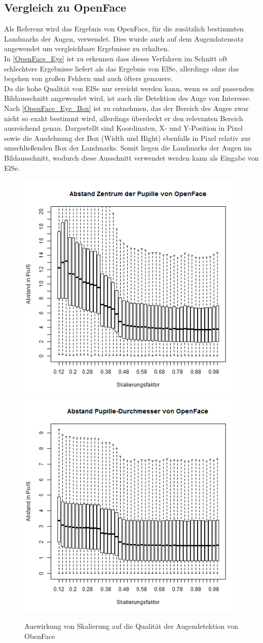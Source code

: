 \subsection{Vergleich zu OpenFace}
Als Referenz wird das Ergebnis von OpenFace, für die zusätzlich bestimmten Landmarks der Augen, verwendet. Dies wurde auch auf dem Augendatensatz \cite{database_Eye} angewendet um vergleichbare Ergebnisse zu erhalten.\\
In \autoref{OpenFace_Eye} ist zu erkennen dass dieses Verfahren im Schnitt oft schlechtere Ergebnisse liefert als das Ergebnis von ElSe, allerdings ohne das begehen von großen Fehlern und auch öfters genauere.\\
Da die hohe Qualität von ElSe nur erreicht werden kann, wenn es auf passenden Bildausschnitt angewendet wird, ist auch die Detektion des Auge von Interesse.\\
Nach \autoref{OpenFace_Eye_Box} ist zu entnehmen, das der Bereich des Auges zwar nicht so exakt bestimmt wird, allerdings überdeckt er den relevanten Bereich ausreichend genau. Dargestellt sind Koordinaten, X- und Y-Position in Pixel sowie die Ausdehnung der Box (Width und Hight) ebenfalls in Pixel relativ zur umschließenden Box der Landmarks. Somit liegen die Landmarks der Augen im Bildausschnitt, wodurch diese Ausschnitt verwendet werden kann als Eingabe von ElSe.
\begin{figure}
	\centering
	\includegraphics[width=0.45\linewidth]{Eye_Img_Box/Openface_PC}
	\includegraphics[width=0.45\linewidth]{Eye_Img_Box/Openface_PW}
	\caption{Auswirkung von Skalierung auf die Qualität der Augendetektion von ObenFace}
	\label{OpenFace_Eye}
\end{figure}
